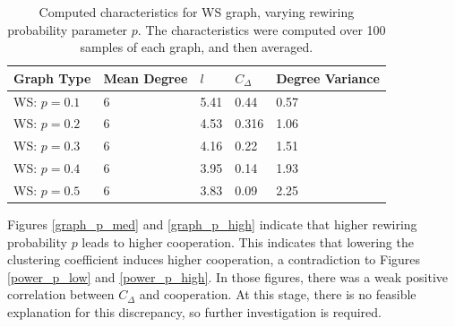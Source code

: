\FloatBarrier
\begin{table}[!h]
\begin{center}
\begin{tabular}{|l|l|l|l|l|}
\hline
Graph Type & Mean Degree & $l$ & $C_\Delta$ & Degree Variance \\ \hline
WS: $p=0.1$        & 6        & 5.41                         & 0.44                  & 0.57           \\ \hline
WS: $p=0.2$        &6           & 4.53                         & 0.316                   & 1.06               \\ \hline
WS: $p=0.3$        &6           & 4.16                         & 0.22                   & 1.51               \\ \hline
WS: $p=0.4$       & 6        & 3.95                         & 0.14                  & 1.93           \\ \hline
WS: $p=0.5$         & 6           & 3.83                         & 0.09                   & 2.25            \\ \hline
\end{tabular}
\caption{Computed characteristics for WS graph, varying rewiring probability parameter $p$. The characteristics were computed over 100 samples of each graph, and then averaged. } \label{graph_stats_WS}
\end{center}
\end{table}
\FloatBarrier

\FloatBarrier
{}
\FloatBarrier
Figures \ref{graph_p_med} and \ref{graph_p_high} indicate that higher rewiring probability $p$ leads to higher cooperation. This indicates that lowering the clustering coefficient induces higher cooperation, a contradiction to Figures \ref{power_p_low} and \ref{power_p_high}. In those figures, there was a weak positive correlation between $C_\Delta$ and cooperation. At this stage, there is no feasible explanation for this discrepancy, so further investigation is required. \\

